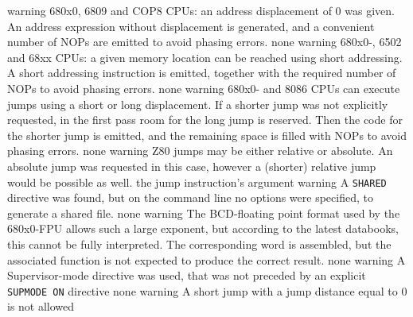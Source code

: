 \documentclass[12pt,twoside]{report}
\newcommand{\tty}[1]{{\tt #1}}
\begin{document}
\begin{description}
               {warning}
               {680x0, 6809 and COP8 CPUs: an address displacement of 0 was
                given.  An address expression without displacement is
                generated, and a convenient number of NOPs are emitted
                to avoid phasing errors.}
               {none}
               {warning}
               {680x0-, 6502 and 68xx CPUs: a given memory location can be
                reached using short addressing. A short addressing
                instruction is emitted, together with the required
                number of NOPs to avoid phasing errors.}
               {none}
               {warning}
               {680x0- and 8086 CPUs can execute jumps using a short or long
                displacement. If a shorter jump was not explicitly
                requested, in the
                first pass room for the long jump is reserved. Then the code
                for the shorter jump is emitted, and the remaining space is
                filled with NOPs to avoid phasing errors.}
               {none}
               {warning}
               {Z80 jumps may be either relative or absolute.  An absolute
                jump was requested in this case, however a (shorter) relative
                jump would be possible as well.}
               {the jump instruction's argument}
               {warning}
               {A \tty{SHARED} directive was found, but on the command line no
                options were specified, to generate a shared file.}
               {none}
               {warning}
               {The BCD-floating point format used by the 680x0-FPU
                allows such a large exponent, but according to the latest
                databooks, this cannot be fully interpreted. The
                corresponding word is assembled, but the associated
                function is not expected to produce the correct result.}
               {none}
               {warning}
               {A Supervisor-mode directive was used, that was not preceded
                by an explicit \tty{SUPMODE ON} directive}
               {none}
               {warning}
               {A short jump with a jump distance equal to 0 is not allowed
}
\end{description}
\end{document}
